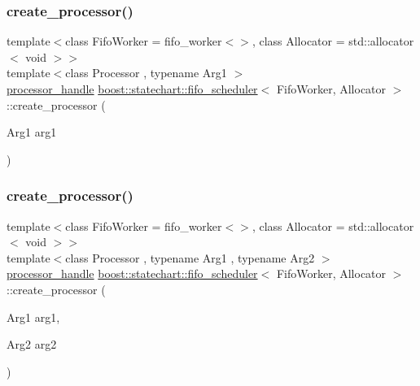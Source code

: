 \subsubsection{\texorpdfstring{create\+\_\+processor()}{create\_processor()}\hspace{0.1cm}{\footnotesize\ttfamily [2/7]}}
{\footnotesize\ttfamily template$<$class Fifo\+Worker = fifo\+\_\+worker$<$$>$, class Allocator = std\+::allocator$<$ void $>$$>$ \\
template$<$class Processor , typename Arg1 $>$ \\
\mbox{\hyperlink{classboost_1_1statechart_1_1fifo__scheduler_ada526939c16c4f8118bc4d7bbf09ad7d}{processor\+\_\+handle}} \mbox{\hyperlink{classboost_1_1statechart_1_1fifo__scheduler}{boost\+::statechart\+::fifo\+\_\+scheduler}}$<$ Fifo\+Worker, Allocator $>$\+::create\+\_\+processor (\begin{DoxyParamCaption}\item[{Arg1}]{arg1 }\end{DoxyParamCaption})\hspace{0.3cm}{\ttfamily [inline]}}

\mbox{\label{classboost_1_1statechart_1_1fifo__scheduler_ac62b7521bb9a38912f2ce9b9694e8769}} 
\subsubsection{\texorpdfstring{create\+\_\+processor()}{create\_processor()}\hspace{0.1cm}{\footnotesize\ttfamily [3/7]}}
{\footnotesize\ttfamily template$<$class Fifo\+Worker = fifo\+\_\+worker$<$$>$, class Allocator = std\+::allocator$<$ void $>$$>$ \\
template$<$class Processor , typename Arg1 , typename Arg2 $>$ \\
\mbox{\hyperlink{classboost_1_1statechart_1_1fifo__scheduler_ada526939c16c4f8118bc4d7bbf09ad7d}{processor\+\_\+handle}} \mbox{\hyperlink{classboost_1_1statechart_1_1fifo__scheduler}{boost\+::statechart\+::fifo\+\_\+scheduler}}$<$ Fifo\+Worker, Allocator $>$\+::create\+\_\+processor (\begin{DoxyParamCaption}\item[{Arg1}]{arg1,  }\item[{Arg2}]{arg2 }\end{DoxyParamCaption})\hspace{0.3cm}{\ttfamily [inline]}}

